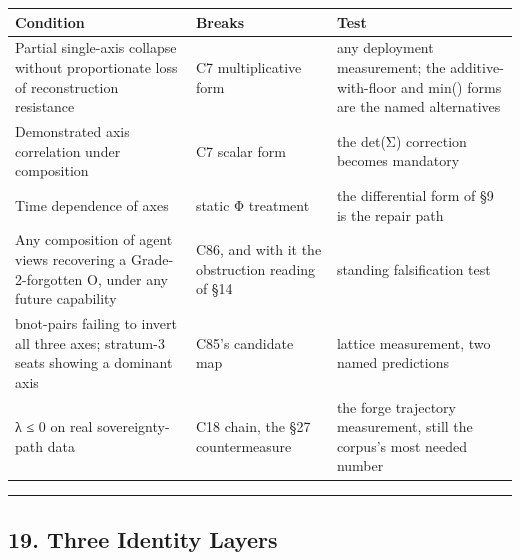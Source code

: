 \documentclass[
]{article}
\newcounter{none} %
\begin{document}
{\def\LTcaptype{none} %
\begin{longtable}[]{@{}
  >{\raggedright\arraybackslash}p{}
  >{\raggedright\arraybackslash}p{}
  >{\raggedright\arraybackslash}p{}@{}}
\toprule\noalign{}
\begin{minipage}[b]{\linewidth}\raggedright
Condition
\end{minipage} & \begin{minipage}[b]{\linewidth}\raggedright
Breaks
\end{minipage} & \begin{minipage}[b]{\linewidth}\raggedright
Test
\end{minipage} \\
\midrule\noalign{}
\endhead
\bottomrule\noalign{}
\endlastfoot
Partial single-axis collapse without proportionate loss of
reconstruction resistance & C7 multiplicative form & any deployment
measurement; the additive-with-floor and min() forms are the named
alternatives \\
Demonstrated axis correlation under composition & C7 scalar form & the
det(Σ) correction becomes mandatory \\
Time dependence of axes & static Φ treatment & the differential form of
§9 is the repair path \\
Any composition of agent views recovering a Grade-2-forgotten O, under
any future capability & C86, and with it the obstruction reading of §14
& standing falsification test \\
bnot-pairs failing to invert all three axes; stratum-3 seats showing a
dominant axis & C85's candidate map & lattice measurement, two named
predictions \\
λ ≤ 0 on real sovereignty-path data & C18 chain, the §27 countermeasure
& the forge trajectory measurement, still the corpus's most needed
number \\
\end{longtable}
}

\begin{center}\rule{0.5\linewidth}{0.5pt}\end{center}

\subsection{19. Three Identity Layers}\label{three-identity-layers}
\end{document}
